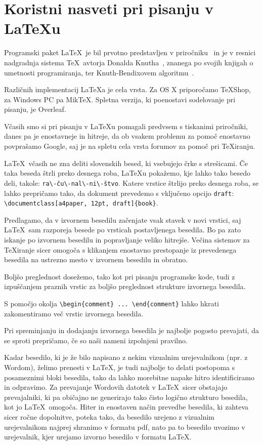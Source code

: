\documentclass[a4paper, 12pt]{book}
\begin{document}
\chapter{Koristni nasveti pri pisanju v \LaTeX{u}}   %
\label{latex}

Programski paket \LaTeX\ je bil prvotno predstavljen v priročniku~\cite{lamport} in je v resnici nadgradnja sistema \TeX\ avtorja Donalda Knutha~\cite{knuth}, 
znanega po svojih knjigah o umetnosti programiranja, 
ter Knuth-Bendixovem algoritmu~\cite{knuth1983simple}.

Različnih implementacij \LaTeX{}a je cela vrsta.
Za OS X priporočamo TeXShop, za Windows PC pa MikTeX.
Spletna verzija, ki poenostavi sodelovanje pri pisanju, je Overleaf.

Včasih smo si pri pisanju v \LaTeX{}u  pomagali predvsem s tiskanimi pri\-ro\-čni\-ki, danes pa je enostavneje in hitreje, da ob vsakem problemu za pomoč enostavno povprašamo Google, 
saj je na spletu cela vrsta forumov za pomoč pri \TeX{}iranju.

\LaTeX\ včasih ne zna deliti slovenskih besed, ki vsebujejo črke s strešicami. 
Če taka beseda štrli preko desnega roba,  \LaTeX{}u pokažemo, kje lahko tako besedo deli, takole: \verb=ra\-ču\-nal\-ni\-štvo=.
Katere vrstice štrlijo preko desnega roba, se lahko prepričamo tako, da dokument prevedemo s vključeno opcijo \texttt{draft}: \verb=\documentclass[a4paper, 12pt, draft]{book}=.


Predlagamo, da v izvornem besedilu začenjate vsak stavek v novi vrstici, saj \LaTeX\ sam razporeja besede po vrsticah postavljenega besedila. 
Bo pa zato iskanje po izvornem besedilu in popravljanje veliko hitrejše. 
Večina sistemov za \TeX{}iranje sicer omogoča s klikanjem enostavno prestopanje  iz prevedenega besedila na ustrezno mesto v izvornem besedilu in obratno.

Boljšo preglednost dosežemo, tako kot pri pisanju programske kode, tudi z izpuščanjem praznih vrstic za boljšo preglednost strukture izvornega besedila.

S pomočjo  okolja \verb=\begin{comment} ... \end{comment}= lahko  hkrati zakomentiramo več vrstic izvornega besedila.

Pri spreminjanju in dodajanju izvornega besedila je najbolje pogosto prevajati, da se sproti prepričamo, če so naši nameni izpolnjeni pravilno.

Kadar besedilo, ki je že bilo napisano z nekim vizualnim urejevalnikom (npr. z Wordom), želimo prenesti v \LaTeX, je tudi najbolje to delati postopoma s posameznimi bloki besedila, 
tako da lahko morebitne napake hitro identificiramo in odpravimo.
Za prevajanje Wordovih datotek v \LaTeX\ sicer obstajajo prevajalniki, ki pa običajno ne generirajo tako čisto logično strukturo besedila, kot jo  \LaTeX\ omogoča.
Hiter in enostaven način prevedbe besedila, ki  zahteva sicer ročne dopolnitve, poteka tako, da besedilo urejeno z vizualnim urejevalnikom najprej shranimo v formatu pdf, 
nato pa to besedilo uvozimo v urejevalnik, kjer urejamo izvorno besedilo v formatu \LaTeX.
\end{document}
